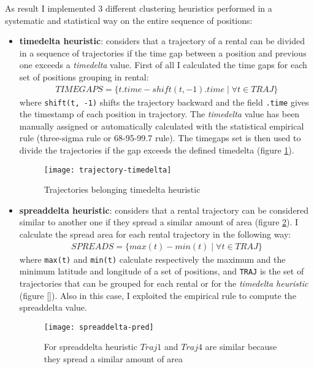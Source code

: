 As result I implemented 3 different clustering heuristics performed in a systematic and statistical way on the entire sequence of positions:
\begin{itemize}
	\item \textbf{timedelta heuristic}: considers that a trajectory of a rental can be divided in a sequence of trajectories if the time gap between a position and previous one exceeds a \textit{timedelta} value. First of all I calculated the time gaps for each set of positions grouping in rental: 
	\begin{align}
		TIMEGAPS = \{t.time - shift(t, -1).time \mid \forall t \in TRAJ \}
	\end{align}
	where \verb|shift(t, -1)| shifts the trajectory backward and the field \verb|.time| gives the timestamp of each position in trajectory. The \textit{timedelta} value has been manually assigned or automatically calculated with the statistical empirical rule (three-sigma rule or 68-95-99.7 rule). The timegaps set is then used to divide the trajectories if the gap exceeds the defined timedelta (figure \ref{fig:trajectory-timedelta}).
	
	\begin{figure}[bt]
		\centering
		\texttt{[image: trajectory-timedelta]}
		\caption{Trajectories belonging timedelta heuristic}
		\label{fig:trajectory-timedelta}
	\end{figure}
	
	\item \textbf{spreaddelta heuristic}: considers that a rental trajectory can be considered similar to another one if they spread a similar amount of area (figure \ref{fig:spreaddelta-pred}). I calculate the spread area for each rental trajectory in the following way: 
	\begin{align}
		SPREADS = \{max(t) - min(t) \mid \forall t \in TRAJ \}
	\end{align}
	where \verb|max(t)| and \verb|min(t)| calculate respectively the maximum and the minimum latitude and longitude of a set of positions, and \verb|TRAJ| is the set of trajectories that can be grouped for each rental or for the \textit{timedelta heuristic} (figure \ref{}). Also in this case, I exploited the empirical rule to compute the spreaddelta value. 
	
	\begin{figure}[bt]
		\centering
		\texttt{[image: spreaddelta-pred]}
		\caption{For spreaddelta heuristic $Traj1$ and $Traj4$ are similar because they spread a similar amount of area}
		\label{fig:spreaddelta-pred}
	\end{figure}


\end{itemize}
